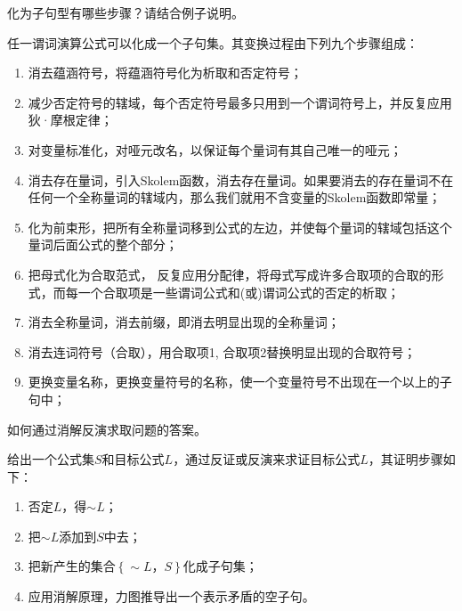 \begin{question}
化为子句型有哪些步骤？请结合例子说明。
\end{question}	
\begin{solution}
任一谓词演算公式可以化成一个子句集。其变换过程由下列九个步骤组成：
	\begin{enumerate}
		\item 消去蕴涵符号，将蕴涵符号化为析取和否定符号；
		\item 减少否定符号的辖域，每个否定符号最多只用到一个谓词符号上，并反复应用狄·摩根定律；
		\item 对变量标准化，对哑元改名，以保证每个量词有其自己唯一的哑元；
		\item 消去存在量词，引入Skolem函数，消去存在量词。如果要消去的存在量词不在任何一个全称量词的辖域内，那么我们就用不含变量的Skolem函数即常量；
		\item 化为前束形，把所有全称量词移到公式的左边，并使每个量词的辖域包括这个量词后面公式的整个部分；
		\item 把母式化为合取范式， 反复应用分配律，将母式写成许多合取项的合取的形式，而每一个合取项是一些谓词公式和(或)谓词公式的否定的析取；
		\item 消去全称量词，消去前缀，即消去明显出现的全称量词；
		\item 消去连词符号（合取），用{合取项1, 合取项2}替换明显出现的合取符号；
		\item 更换变量名称，更换变量符号的名称，使一个变量符号不出现在一个以上的子句中；
	\end{enumerate}
\end{solution}

\begin{question}
如何通过消解反演求取问题的答案。
\end{question}	
\begin{solution}
给出一个公式集$S$和目标公式$L$，通过反证或反演来求证目标公式$L$，其证明步骤如下： 
	\begin{enumerate}
		\item 否定$L$，得$\sim L$； 
		\item 把$\sim L$添加到$S$中去； 
		\item 把新产生的集合$\left\{\sim L，S\right\}$化成子句集； 
		\item 应用消解原理，力图推导出一个表示矛盾的空子句。
	\end{enumerate}
\end{solution}

